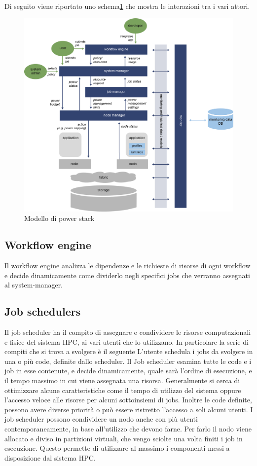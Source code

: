 Di seguito viene riportato uno schema\ref{fig:powerstackscheme} che mostra le interazioni tra i vari attori.
\begin{figure}[H]
    \centering
    \includegraphics[width=\textwidth]{img/REGALE-Architecture-1536x1421.png}
    \caption{Modello di power stack} 
    \label{fig:powerstackscheme}
\end{figure}
\subsection{Workflow engine}
Il workflow engine analizza le dipendenze e le richieste di risorse di ogni workflow e decide dinamicamente come dividerlo negli specifici jobs che verranno assegnati al system-manager.

\subsection{Job schedulers}
Il job scheduler ha il compito di assegnare e condividere le risorse computazionali e fisice del sistema HPC, ai vari utenti che lo utilizzano. In particolare la serie di compiti che si trova a svolgere è il seguente L'utente schedula i jobs da svolgere in una o più code, definite dallo scheduler. Il Job scheduler esamina tutte le code e i job in esse contenute, e decide dinamicamente, quale sarà l'ordine di esecuzione, e il tempo massimo in cui viene assegnata una risorsa. Generalmente si cerca di ottimizzare alcune caratteristiche come il tempo di utilizzo del sistema oppure l'accesso veloce alle risorse per alcuni sottoinsiemi di jobs. Inoltre le code definite, possono avere diverse priorità o può essere ristretto l'accesso a soli alcuni utenti. I job scheduler possono condividere un nodo anche con più utenti contemporaneamente, in base all'utilizzo che devono farne. Per farlo il nodo viene allocato e diviso in partizioni virtuali, che vengo sciolte una volta finiti i job in esecuzione. Questo permette di utilizzare al massimo i componenti messi a disposizione dal sistema HPC.

